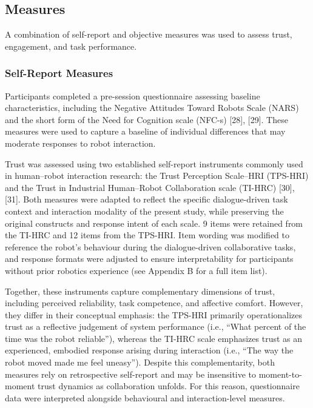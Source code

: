 \documentclass[
  letterpaper,
  DIV=11,
  numbers=noendperiod]{scrartcl}
\begin{document}
\subsection{Measures}\label{measures}

A combination of self-report and objective measures was used to assess
trust, engagement, and task performance.

\subsubsection{Self-Report Measures}\label{self-report-measures}

Participants completed a pre-session questionnaire assessing baseline
characteristics, including the Negative Attitudes Toward Robots Scale
(NARS) and the short form of the Need for Cognition scale (NFC-s)
{[}28{]}, {[}29{]}. These measures were used to capture a baseline of
individual differences that may moderate responses to robot interaction.

Trust was assessed using two established self-report instruments
commonly used in human--robot interaction research: the Trust Perception
Scale--HRI (TPS-HRI) and the Trust in Industrial Human--Robot
Collaboration scale (TI-HRC) {[}30{]}, {[}31{]}. Both measures were
adapted to reflect the specific dialogue-driven task context and
interaction modality of the present study, while preserving the original
constructs and response intent of each scale. 9 items were retained from
the TI-HRC and 12 items from the TPS-HRI. Item wording was modified to
reference the robot's behaviour during the dialogue-driven collaborative
tasks, and response formats were adjusted to ensure interpretability for
participants without prior robotics experience (see Appendix B for a
full item list).

Together, these instruments capture complementary dimensions of trust,
including perceived reliability, task competence, and affective comfort.
However, they differ in their conceptual emphasis: the TPS-HRI primarily
operationalizes trust as a reflective judgement of system performance
(i.e., ``What percent of the time was the robot reliable''), whereas the
TI-HRC scale emphasizes trust as an experienced, embodied response
arising during interaction (i.e., ``The way the robot moved made me feel
uneasy''). Despite this complementarity, both measures rely on
retrospective self-report and may be insensitive to moment-to-moment
trust dynamics as collaboration unfolds. For this reason, questionnaire
data were interpreted alongside behavioural and interaction-level
measures.
\end{document}
